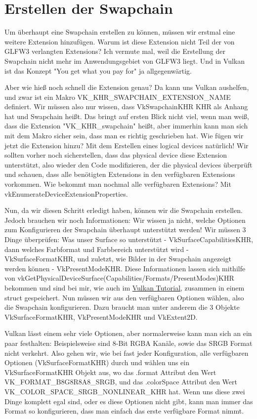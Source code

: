 \documentclass[11pt,a4paper]{report}
\begin{document}
\section{Erstellen der Swapchain}
Um überhaupt eine Swapchain erstellen zu können, müssen wir erstmal eine weitere Extension hinzufügen. Warum ist diese Extension nicht Teil der von GLFW3 verlangten Extensions? Ich vermute mal, weil die Erstellung der Swapchain nicht mehr im Anwendungsgebiet von GLFW3 liegt. Und in Vulkan ist das Konzept "You get what you pay for" ja allgegenwärtig.

Aber wie hieß noch schnell die Extension genau? Da kann uns Vulkan aushelfen, und zwar ist ein Makro VK\_KHR\_SWAPCHAIN\_EXTENSION\_NAME definiert. Wir müssen also nur wissen, dass VkSwapchainKHR KHR als Anhang hat und Swapchain heißt. Das bringt auf ersten Blick nicht viel, wenn man weiß, dass die Extension "VK\_KHR\_swapchain" heißt, aber immerhin kann man sich mit dem Makro sicher sein, dass man es richtig geschrieben hat. Wie fügen wir jetzt die Extension hinzu? Mit dem Erstellen eines logical devices natürlich! Wir sollten vorher noch sicherstellen, dass das physical device diese Extension unterstützt, also wieder den Code modifizieren, der die physical devices überprüft und schauen, dass alle benötigten Extensions in den verfügbaren Extensions vorkommen. Wie bekommt man nochmal alle verfügbaren Extensions? Mit vkEnumerateDeviceExtensionProperties.

Nun, da wir diesen Schritt erledigt haben, können wir die Swapchain erstellen. Jedoch brauchen wir noch Informationen: Wir wissen ja nicht, welche Optionen zum Konfigurieren der Swapchain überhaupt unterstützt werden! Wir müssen 3 Dinge überprüfen: Was unser Surface so unterstützt - VkSurfaceCapabilitiesKHR, dann welches Farbformat und Farbbereich unterstützt wird - VkSurfaceFormatKHR, und zuletzt, wie Bilder in der Swapchain angezeigt werden können - VkPresentModeKHR. Diese Informationen lassen sich mithilfe von vkGetPhysicalDeviceSurface(Capabilities/Formats/PresentModes)KHR bekommen und sind bei mir, wie auch im \href{https://vulkan-tutorial.com}{Vulkan Tutorial}, zusammen in einem struct gespeichert. Nun müssen wir aus den verfügbaren Optionen wählen, also die Swapchain konfigurieren. Dazu braucht man unter anderem die 3 Objekte VkSurfaceFormatKHR, VkPresentModeKHR und VkExtent2D.

Vulkan lässt einem sehr viele Optionen, aber normalerweise kann man sich an ein paar festhalten: Beispielsweise sind 8-Bit RGBA Kanäle, sowie das SRGB Format nicht verkehrt. Also gehen wir, wie bei fast jeder Konfiguration, alle verfügbaren Optionen (VkSurfaceFormatKHR) durch und wählen uns ein VkSurfaceFormatKHR Objekt aus, wo das .format Attribut den Wert VK\_FORMAT\_B8G8R8A8\_SRGB, und das .colorSpace Attribut den Wert VK\_COLOR\_SPACE\_SRGB\_NONLINEAR\_KHR hat. Wenn uns diese zwei Dinge komplett egal sind, oder es diese Optionen nicht gibt, kann man immer das Format so konfigurieren, dass man einfach das erste verfügbare Format nimmt.
\end{document}
